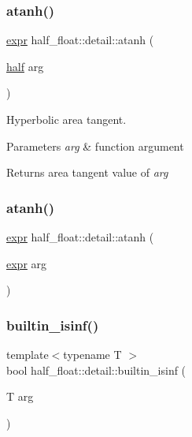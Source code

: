 \subsubsection{\texorpdfstring{atanh()}{atanh()}\hspace{0.1cm}{\footnotesize\ttfamily [1/2]}}
{\footnotesize\ttfamily \hyperlink{structhalf__float_1_1detail_1_1expr}{expr} half\+\_\+float\+::detail\+::atanh (\begin{DoxyParamCaption}\item[{\hyperlink{classhalf__float_1_1half}{half}}]{arg }\end{DoxyParamCaption})\hspace{0.3cm}{\ttfamily [inline]}}

Hyperbolic area tangent. 
\begin{DoxyParams}{Parameters}
{\em arg} & function argument \\
\hline
\end{DoxyParams}
\begin{DoxyReturn}{Returns}
area tangent value of {\itshape arg} 
\end{DoxyReturn}
\mbox{\label{namespacehalf__float_1_1detail_ac77afd4c7e55ed6a9b017d6ffa28d6e1}} 
\subsubsection{\texorpdfstring{atanh()}{atanh()}\hspace{0.1cm}{\footnotesize\ttfamily [2/2]}}
{\footnotesize\ttfamily \hyperlink{structhalf__float_1_1detail_1_1expr}{expr} half\+\_\+float\+::detail\+::atanh (\begin{DoxyParamCaption}\item[{\hyperlink{structhalf__float_1_1detail_1_1expr}{expr}}]{arg }\end{DoxyParamCaption})\hspace{0.3cm}{\ttfamily [inline]}}

\mbox{\label{namespacehalf__float_1_1detail_aeb1b5890af847586d019111c931e7f3b}} 
\subsubsection{\texorpdfstring{builtin\+\_\+isinf()}{builtin\_isinf()}}
{\footnotesize\ttfamily template$<$typename T $>$ \\
bool half\+\_\+float\+::detail\+::builtin\+\_\+isinf (\begin{DoxyParamCaption}\item[{T}]{arg }\end{DoxyParamCaption})}


